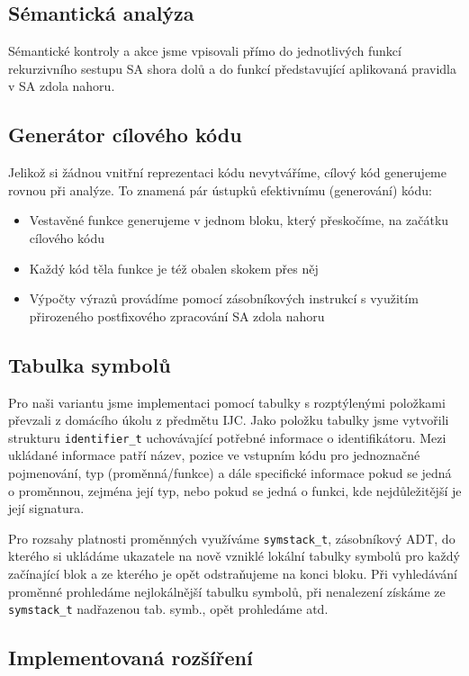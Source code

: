 \documentclass[11pt,a4paper]{article}
\begin{document}
    \subsection{Sémantická analýza}
    Sémantické kontroly a akce jsme vpisovali přímo do jednotlivých funkcí rekurzivního sestupu SA shora dolů a do funkcí představující aplikovaná pravidla v SA zdola nahoru.
    
    \subsection{Generátor cílového kódu}
    Jelikož si žádnou vnitřní reprezentaci kódu nevytváříme, cílový kód generujeme rovnou při analýze. To znamená pár ústupků efektivnímu (generování) kódu:
    \begin{itemize}
        \item Vestavěné funkce generujeme v jednom bloku, který přeskočíme, na začátku cílového kódu
        \item Každý kód těla funkce je též obalen skokem přes něj
        \item Výpočty výrazů provádíme pomocí zásobníkových instrukcí s využitím přirozeného postfixového zpracování SA zdola nahoru
    \end{itemize}
    
    \subsection{Tabulka symbolů}
    Pro naši variantu jsme implementaci pomocí tabulky s rozptýlenými položkami převzali z domácího úkolu z předmětu IJC. Jako položku tabulky jsme vytvořili strukturu \texttt{identifier\_t} uchovávající potřebné informace o identifikátoru. Mezi ukládané informace patří název, pozice ve vstupním kódu pro jednoznačné pojmenování, typ (proměnná/funkce) a dále specifické informace pokud se jedná o proměnnou, zejména její typ, nebo pokud se jedná o funkci, kde nejdůležitější je její signatura.
    
    Pro rozsahy platnosti proměnných využíváme \texttt{symstack\_t}, zásobníkový ADT, do kterého si ukládáme ukazatele na nově vzniklé lokální tabulky symbolů pro každý začínající blok a ze kterého je opět odstraňujeme na konci bloku. Při vyhledávání proměnné prohledáme nejlokálnější tabulku symbolů, při nenalezení získáme ze \texttt{symstack\_t} nadřazenou tab. symb., opět prohledáme atd.
    
    \subsection{Implementovaná rozšíření}
    
\end{document}
